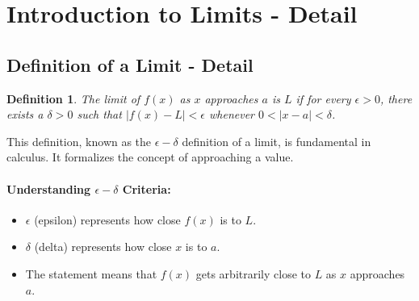 \documentclass[a4paper,12pt]{book}
\newtheorem{definition}{Definition}
\begin{document}
\section{Introduction to Limits - Detail}
\subsection{Definition of a Limit - Detail}
\begin{definition}
The limit of \( f(x) \) as \( x \) approaches \( a \) is \( L \) if for every \( \epsilon > 0 \), there exists a \( \delta > 0 \) such that \( |f(x) - L| < \epsilon \) whenever \( 0 < |x - a| < \delta \).
\end{definition}

This definition, known as the \(\epsilon-\delta\) definition of a limit, is fundamental in calculus. It formalizes the concept of approaching a value.

\paragraph{Understanding \(\epsilon-\delta\) Criteria:}
\begin{itemize}
    \item \(\epsilon\) (epsilon) represents how close \( f(x) \) is to \( L \).
    \item \(\delta\) (delta) represents how close \( x \) is to \( a \).
    \item The statement means that \( f(x) \) gets arbitrarily close to \( L \) as \( x \) approaches \( a \).
\end{itemize}
\end{document}
